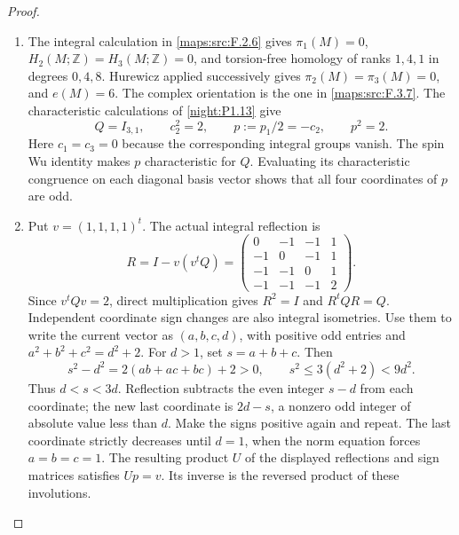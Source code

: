 \begin{proof}
\begin{enumerate}[label=\arabic*.]
\item The integral calculation in \cref{maps:src:F.2.6} gives
$\pi_1(M)=0$, $H_2(M;\mathbb Z)=H_3(M;\mathbb Z)=0$, and
torsion-free homology of ranks $1,4,1$ in degrees $0,4,8$.
Hurewicz applied successively gives $\pi_2(M)=\pi_3(M)=0$, and
$e(M)=6$. The complex orientation is the one in
\cref{maps:src:F.3.7}. The characteristic calculations of \cref{night:P1.13} give
\[
Q=I_{3,1},\qquad c_2^2=2,\qquad
p:=p_1/2=-c_2,\qquad p^2=2.
\]
Here $c_1=c_3=0$ because the corresponding integral groups vanish.
The spin Wu identity makes $p$ characteristic for $Q$. Evaluating
its characteristic congruence on each diagonal basis vector shows
that all four coordinates of $p$ are odd.

\item Put $v=(1,1,1,1)^t$. The actual integral reflection is
\[
R=I-v(v^tQ)=
\begin{pmatrix}
0&-1&-1&1\\
-1&0&-1&1\\
-1&-1&0&1\\
-1&-1&-1&2
\end{pmatrix}.
\]
Since $v^tQv=2$, direct multiplication gives $R^2=I$ and
$R^tQR=Q$. Independent coordinate sign changes are also integral
isometries. Use them to write the current vector as $(a,b,c,d)$,
with positive odd entries and
$a^2+b^2+c^2=d^2+2$. For $d>1$, set $s=a+b+c$. Then
\[
s^2-d^2=2(ab+ac+bc)+2>0,\qquad
s^2\leq3(d^2+2)<9d^2.
\]
Thus $d<s<3d$. Reflection subtracts the even integer $s-d$ from
each coordinate; the new last coordinate is $2d-s$, a nonzero odd
integer of absolute value less than $d$. Make the signs positive
again and repeat. The last coordinate strictly decreases until
$d=1$, when the norm equation forces $a=b=c=1$. The resulting
product $U$ of the displayed reflections and sign matrices satisfies
$Up=v$. Its inverse is the reversed product of these involutions.


\end{enumerate}
\end{proof}
